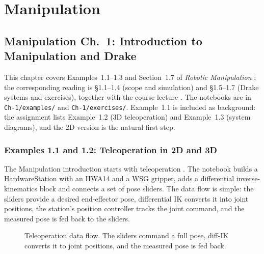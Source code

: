 \documentclass[11pt]{report}
\renewcommand{\chaptermark}[1]{\markboth{#1}{}}
\begin{document}
\part{Manipulation}

\chapter[Manipulation Ch.~1: Introduction to Manipulation and Drake]%
        {Manipulation Ch.~1: Introduction to Manipulation and Drake}
\chaptermark{Ch.~1: Manipulation and Drake}

This chapter covers Examples~1.1--1.3 and Section~1.7 of
\emph{Robotic Manipulation} \cite{manipulation-intro}; the corresponding
reading is \S1.1--1.4 (scope and simulation) and \S1.5--1.7 (Drake systems and
exercises), together with the course lecture \cite{lectures}.  The notebooks are in
\texttt{Ch-1/examples/} and \texttt{Ch-1/exercises/}.  Example~1.1 is included
as background: the assignment lists Example~1.2 (3D teleoperation) and
Example~1.3 (system diagrams), and the 2D version is the natural first step.

\section{Examples 1.1 and 1.2: Teleoperation in 2D and 3D}

The Manipulation introduction starts with teleoperation \cite{manipulation-intro}.  The notebook builds
a HardwareStation with an IIWA14 and a WSG gripper, adds a differential
inverse-kinematics block and connects a set of pose sliders.  The data flow is
simple: the sliders provide a desired end-effector pose, differential IK
converts it into joint positions, the station's position controller tracks
the joint command, and the measured pose is fed back to the sliders.

\begin{figure}[htbp]
\centering
{}
\caption{Teleoperation data flow.  The sliders command a full pose, diff-IK
converts it to joint positions, and the measured pose is fed back.}
\end{figure}
\end{document}
